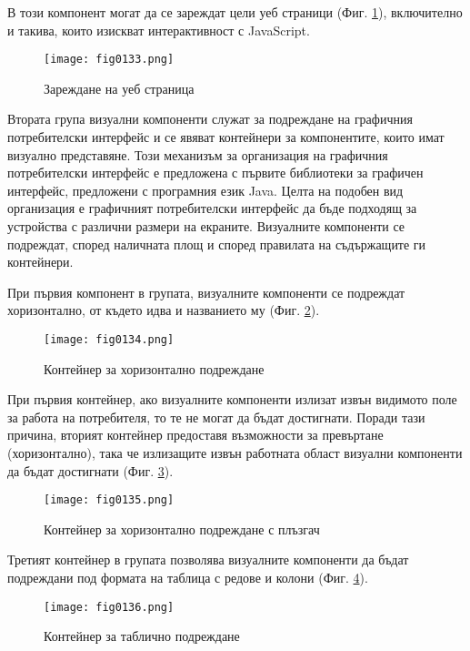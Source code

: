 В този компонент могат да се зареждат цели уеб страници (Фиг. \ref{fig0133}), включително и такива, които изискват интерактивност с JavaScript.

\begin{figure}[H]
  \centering
  \texttt{[image: fig0133.png]}
  \caption{Зареждане на уеб страница}
\label{fig0133}
\end{figure}

Втората група визуални компоненти служат за подреждане на графичния потребителски интерфейс и се явяват контейнери за компонентите, които имат визуално представяне. Този механизъм за организация на графичния потребителски интерфейс е предложена с първите библиотеки за графичен интерфейс, предложени с програмния език Java. Целта на подобен вид организация е графичният потребителски интерфейс да бъде подходящ за устройства с различни размери на екраните. Визуалните компоненти се подреждат, според наличната площ и според правилата на съдържащите ги контейнери. 

При първия компонент в групата, визуалните компоненти се подреждат хоризонтално, от където идва и названието му (Фиг. \ref{fig0134}).

\begin{figure}[H]
  \centering
  \texttt{[image: fig0134.png]}
  \caption{Контейнер за хоризонтално подреждане}
\label{fig0134}
\end{figure}

При първия контейнер, ако визуалните компоненти излизат извън видимото поле за работа на потребителя, то те не могат да бъдат достигнати. Поради тази причина, вторият контейнер предоставя възможности за превъртане (хоризонтално), така че излизащите извън работната област визуални компоненти да бъдат достигнати (Фиг. \ref{fig0135}).

\begin{figure}[H]
  \centering
  \texttt{[image: fig0135.png]}
  \caption{Контейнер за хоризонтално подреждане с плъзгач}
\label{fig0135}
\end{figure}

Третият контейнер в групата позволява визуалните компоненти да бъдат подреждани под формата на таблица с редове и колони (Фиг. \ref{fig0136}).

\begin{figure}[H]
  \centering
  \texttt{[image: fig0136.png]}
  \caption{Контейнер за таблично подреждане}
\label{fig0136}
\end{figure}


